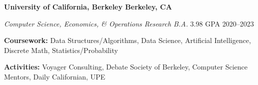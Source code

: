 \textbf{University of California, Berkeley \hfill Berkeley, CA} \par
\textit{Computer Science, Economics, \& Operations Research B.A.} 3.98 GPA \hfill 2020--2023\par
\textbf{Coursework:} Data Structures/Algorithms, Data Science, Artificial Intelligence, Discrete Math, Statistics/Probability\par
\textbf{Activities:} Voyager Consulting, Debate Society of Berkeley, Computer Science Mentors, Daily Californian, UPE
